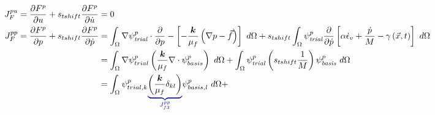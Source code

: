 \begin{align}
    J_F^{pu} = \frac{\partial F^p}{\partial u} + s_{tshift} \frac{\partial F^p}{\partial \dot{u}}                                  & = 0                                                                                                                                          \\
    J_F^{pp} = \frac{\partial F^p}{\partial p} + s_{tshift} \frac{\partial F^p}{\partial \dot{p}}                                  & =
    \int_{\Omega} \nabla \trialscalar[p] \cdot \frac{\partial}{\partial p} -\left[-\frac{\tensor{k}}{\mu_{f}} \left(\nabla p - \vec{f} \right) \right] \ d\Omega  +
    s_{tshift}\int_{\Omega} \trialscalar[p] \frac{\partial}{\partial \dot{p}} \left[\alpha\dot{\epsilon}_{v} + \frac{\dot{p}}{M} - \gamma\left(\vec{x},t\right)\right] \ d\Omega                                                                                                  \\
                                                                                                                                   & = \int_{\Omega} \nabla \psi_{trial}^ p \left(\frac{\tensor{k}}{\mu_{f}} \nabla \cdot \psi_{basis}^p \right) \ d\Omega +
    \int_{\Omega} \trialscalar[p] \left(s_{tshift} \frac{1}{M}\right) \basisscalar[p] \ d\Omega                                                                                                                                                                                   \\
                                                                                                                                   & = \int_{\Omega} \psi_{trial,k}^p \eqnannotate{\left(\frac{\tensor{k}}{\mu_{f}} \delta_{kl}\right)}{J_{f3}^{pp}} \psi_{basis,l}^p \ d\Omega +

\end{align}
